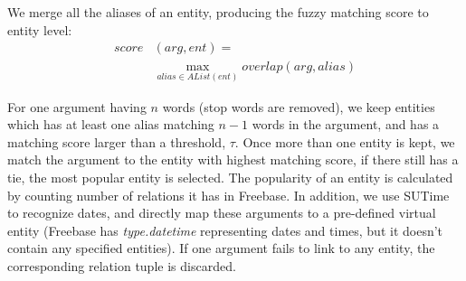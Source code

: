 \noindent
We merge all the aliases of an entity, producing the fuzzy matching score to entity level:
\begin{equation}
\begin{aligned}
score&(arg, ent) = \\
&\max\limits_{alias \in AList(ent)} overlap(arg, alias)
\end{aligned}
\end{equation}

For one argument having $n$ words (stop words are removed), we keep entities which has at least one alias
matching $n-1$ words in the argument, and has a matching score larger than a threshold, $\tau$.
Once more than one entity is kept, we match the argument to the entity with highest matching score,
if there still has a tie, the most popular entity is selected. The popularity of an entity is calculated
by counting number of relations it has in Freebase.
In addition, we use SUTime \cite{chang2012sutime} to recognize dates, and directly
map these arguments to a pre-defined virtual entity (Freebase has \textit{type.datetime}
representing dates and times, but it doesn't contain any specified entities).
If one argument fails to link to any entity, the corresponding relation tuple is discarded.
%



